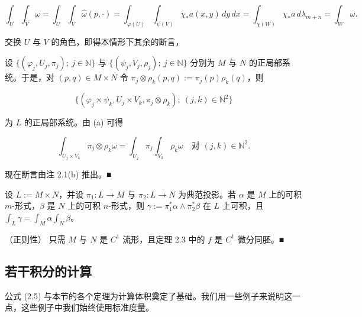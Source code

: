 \begin{theorem}
\begin{items}
\[
\int_U \int_V \omega = \int_U \int_V \widehat{\omega}(p,\cdot) = \int_{\varphi(U)} \int_{\psi(V)} \chi_*a(x,y)\,dy\,dx = \int_{\chi(W)} \chi_*a\,d\lambda_{m+n} = \int_W \omega.
\]

交换 $ U $ 与 $ V $ 的角色，即得本情形下其余的断言，

\item

设 $ \{ (\varphi_j,U_j,\pi_j) ;\ j \in \mathbb{N} \} $ 与 $ \{ (\psi_j,V_j,\rho_j) ;\ j \in \mathbb{N} \} $ 分别为 $ M $ 与 $ N $ 的正局部系统。于是，对 $ (p,q) \in M \times N $ 令 $ \pi_j \otimes \rho_k(p,q) := \pi_j(p)\rho_k(q) $，则

\[
\{ (\varphi_j \times \psi_k, U_j \times V_k, \pi_j \otimes \rho_k) ;\ (j,k) \in \mathbb{N}^2 \}
\]

为 $ L $ 的正局部系统。由 (a) 可得

\[
\int_{U_j \times V_k} \pi_j \otimes \rho_k \omega = \int_{U_j} \pi_j \int_{V_k} \rho_k \omega \quad \text{对 } (j,k) \in \mathbb{N}^2 .
\]

现在断言由注 2.1(b) 推出。\nobreak\hspace{0.35em}■

\end{items}

\end{theorem}

\begin{corollary}

设 $ L := M \times N $，并设 $ \pi_1: L \to M $ 与 $ \pi_2: L \to N $ 为典范投影。若 $ \alpha $ 是 $ M $ 上的可积 $ m $-形式，$ \beta $ 是 $ N $ 上的可积 $ n $-形式，则 $ \gamma := \pi_1^*\alpha \wedge \pi_2^*\beta $ 在 $ L $ 上可积，且 $ \int_L \gamma = \int_M \alpha \int_N \beta $。

\end{corollary}

\begin{remark}

（正则性） 只需 $ M $ 与 $ N $ 是 $ C^1 $ 流形，且定理 2.3 中的 $ f $ 是 $ C^1 $ 微分同胚。\nobreak\hspace{0.35em}■

\end{remark}

\subsection*{若干积分的计算}

公式 (2.5) 与本节的各个定理为计算体积奠定了基础。我们用一些例子来说明这一点，这些例子中我们始终使用标准度量。

